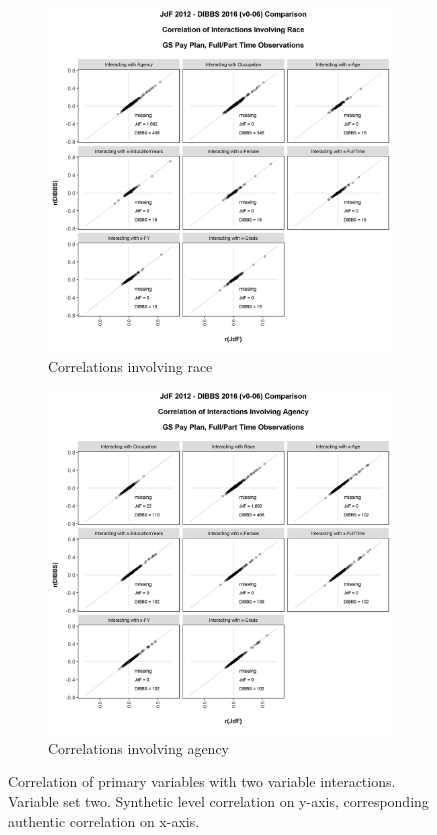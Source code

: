 \documentclass[10pt, letterpaper]{article}
\begin{document}
\begin{spacing}{1.0}
\clearpage

\begin{figure}[h]
    \centering
    \begin{subfigure}{1\textwidth}
        \centering
        \includegraphics[width=4.5in, trim={0 0.2in 0 1in}, clip]{JdFDIBBSCorrelationInteraction-Race.png}
        \caption{Correlations involving race}
        \vspace{12pt}
    \end{subfigure}
    \begin{subfigure}{1\textwidth}
        \centering
        \includegraphics[width=4.5in, trim={0 0.2in 0 1in}, clip]{JdFDIBBSCorrelationInteraction-Agency.png}
        \caption{Correlations involving agency}
        \vspace{12pt}
    \end{subfigure}
    \caption{Correlation of primary variables with two variable interactions.  Variable set two.  Synthetic level correlation on y-axis, corresponding authentic correlation on x-axis.}
    \label{figure:JdFDIBBSCorrelationInteraction2}
\end{figure}


\end{spacing}
\end{document}
